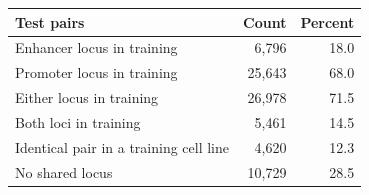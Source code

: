 \begin{tabular}{lrr}
\toprule
Test pairs & Count & Percent \\
\midrule
Enhancer locus in training & 6,796 & 18.0 \\
Promoter locus in training & 25,643 & 68.0 \\
Either locus in training & 26,978 & 71.5 \\
Both loci in training & 5,461 & 14.5 \\
Identical pair in a training cell line & 4,620 & 12.3 \\
No shared locus & 10,729 & 28.5 \\
\bottomrule
\end{tabular}
